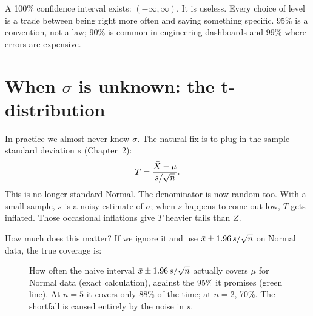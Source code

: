 A 100\% confidence interval exists: $(-\infty, \infty)$. It is useless. Every
choice of level is a trade between being right more often and saying something
specific. 95\% is a convention, not a law; 90\% is common in engineering
dashboards and 99\% where errors are expensive.

\section{When \texorpdfstring{$\sigma$}{sigma} is unknown: the t-distribution}
\label{sec:ci-t}

In practice we almost never know $\sigma$. The natural fix is to plug in the
sample standard deviation $s$ (Chapter~2):
\[
  T = \frac{\bar{X} - \mu}{s/\sqrt n}.
\]
This is no longer standard Normal. The denominator is now random too. With a
small sample, $s$ is a noisy estimate of $\sigma$; when $s$ happens to come
out low, $T$ gets inflated. Those occasional inflations give $T$ heavier tails
than $Z$.

How much does this matter? If we ignore it and use $\bar{x} \pm 1.96\,s/\sqrt n$
on Normal data, the true coverage is:

\begin{figure}[H]
\centering
{}
\caption{How often the naive interval $\bar{x}\pm 1.96\,s/\sqrt n$ actually
covers $\mu$ for Normal data (exact calculation), against the 95\% it
promises (green line). At $n=5$ it covers only 88\% of the time; at $n=2$, 70\%. The
shortfall is caused entirely by the noise in $s$.}
\label{fig:ci-naive-coverage}
\end{figure}

